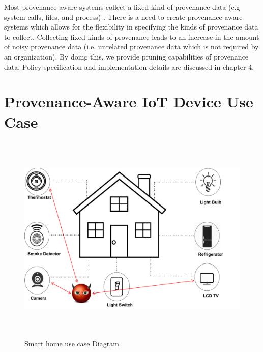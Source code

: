 Most provenance-aware systems collect a fixed kind of provenance data (e.g system calls, files, and process)  \cite{King:2003:BI:945445.945467, altintas,glavic_case_2011}. There is a need to create provenance-aware systems which allows for the flexibility in specifying the kinds of provenance data to collect. Collecting fixed kinds of provenance leads to  an increase in the amount of noisy provenance data (i.e. unrelated provenance data which is not required by an organization). By doing this, we provide pruning capabilities \cite{braun2006issues} of provenance data. Policy specification and implementation details are discussed in chapter 4.  










\section{Provenance-Aware IoT Device Use Case}

\begin{figure}[tb]
\begin{center}
\includegraphics[height=4in]{smart_home_2.png}
\end{center}
\caption{Smart home use case Diagram}
\label{smart_home}
\end{figure}



